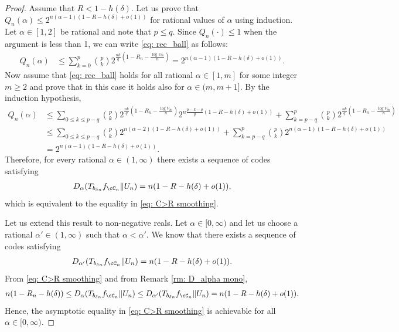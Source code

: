 \documentclass{amsart}
\theoremstyle{remark}
\newcommand{\ab}[1]{{\footnotesize\color{red}{[AB: #1]}}}
\begin{document}
\begin{proof}
 Assume that $R <1-h(\delta)$.  Let us prove that $Q_n(\alpha) \leq  2^{n(\alpha-1)(1-R-h(\delta) +o(1))}$ for rational values of $\alpha$ using induction. Let $\alpha \in [1,2]$ be rational and note that $p\leq q$. Since $Q_n(\cdot) \leq 1$ when the argument is less than 1, we can write \eqref{eq: rec_ball} as
follows:
\begin{align*}
    Q_n(\alpha) & \leq \sum_{k=0}^p \binom{p}{k} 2^{\frac{nk}{q}(1-R_n-\frac{\log V_{\delta n}}{n})} = 2^{n(\alpha-1)(1-R-h(\delta) +o(1))}.
\end{align*}
Now assume that \eqref{eq: rec_ball} holds for all rational $\alpha \in [1,m]$ for some integer  $m \geq 2$ and
prove that in this case it holds also for $\alpha\in(m,m+1].$ 
By the induction hypothesis,
 \begin{align*}
    Q_n(\alpha) & \leq \sum_{0\leq k\leq p-q} \binom{p}{k} 2^{\frac{nk}{q}(1-R_n-\frac{\log V_{\delta n}}{n})}2^{n\frac{p-k-q}{q}(1-R-h(\delta) +o(1))} +\sum_{k = p-q}^p \binom{p}{k} 2^{\frac{nk}{q}(1-R_n-\frac{\log V_{\delta n}}{n})} \\
    & \leq \sum_{0\leq k\leq p-q} \binom{p}{k} 2^{n(\alpha-2)(1-R-h(\delta) +o(1))} + \sum_{k =p-q}^p \binom{p}{k} 2^{n(\alpha-1)(1-R-h(\delta)+o(1))}\\
    & = 2^{n(\alpha-1)(1-R-h(\delta) +o(1))}.
\end{align*}
Therefore,  for every rational $\alpha \in (1,\infty)$ there exists a sequence of codes satisfying  
\begin{align}\label{eq: C>R ach}
  D_{\alpha}(T_{b_{\delta n}}f_{\cC_n}\|U_n) = n(1-R-h(\delta) +o(1)),  
\end{align}
which is equivalent to the equality in \eqref{eq: C>R smoothing}. 

Let us extend this result to non-negative reals. Let $\alpha \in [0,\infty)$ and let us choose a rational $\alpha' \in (1,\infty)$ such that $\alpha < \alpha'$.
We know that there exists a sequence of codes satisfying  
\begin{align*}
  D_{\alpha'}(T_{b_{\delta n}}f_{\cC_n}\|U_n) = n(1-R-h(\delta) +o(1)).
\end{align*}
From \eqref{eq: C>R smoothing} and from Remark \ref{rm: D_alpha mono},
\begin{align*}
      n(1-R_n-h(\delta)) \leq  D_{\alpha}(T_{b_{\delta n}}f_{\cC_n}\|U_n) \leq D_{\alpha'}(T_{b_{\delta n}}f_{\cC_n}\|U_n) = n(1-R-h(\delta) +o(1)).
\end{align*}
Hence, the asymptotic equality in \eqref{eq: C>R smoothing} is achievable for all $\alpha \in [0,\infty)$.


\end{proof}
\end{document}
